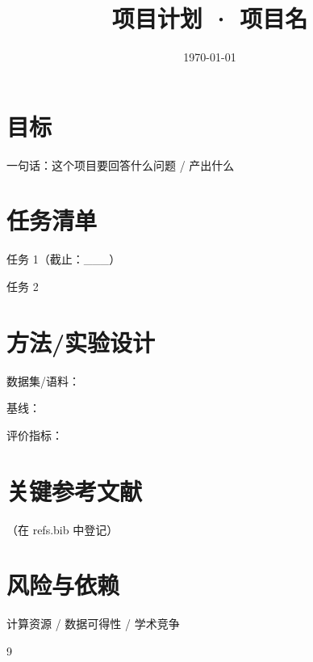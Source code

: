\documentclass[11pt]{ctexart}
\title{项目计划 · 项目名}
\date{\today}
\begin{document}
\maketitle

\section{目标}
\begin{compactitem}
  \item 一句话：这个项目要回答什么问题 / 产出什么
\end{compactitem}

\section{任务清单}
\begin{compactitem}
  \item [ ] 任务 1（截止：___）
  \item [ ] 任务 2
\end{compactitem}

\section{方法/实验设计}
\begin{compactitem}
  \item 数据集/语料：
  \item 基线：
  \item 评价指标：
\end{compactitem}

\section{关键参考文献}
\begin{compactitem}
  \item \cite{key}（在 refs.bib 中登记）
\end{compactitem}

\section{风险与依赖}
\begin{compactitem}
  \item 计算资源 / 数据可得性 / 学术竞争
\end{compactitem}

\begin{thebibliography}{9}
\end{thebibliography}
\end{document}
